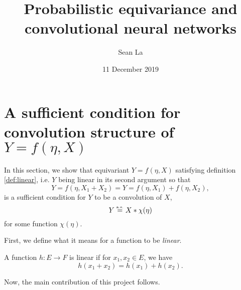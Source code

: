 \documentclass[10pt]{article}
\title{Probabilistic equivariance and convolutional neural networks} %
\author{Sean La} %
\date{11 December 2019} %
\begin{document}
\maketitle



\section{A sufficient condition for convolution structure of $Y = f(\eta,X)$}
In this section, we show that equivariant $Y = f(\eta,X)$ satisfying definition \ref{def:linear}, i.e. $Y$ being linear in its second argument so that
$$
	Y = f(\eta, X_1 + X_2) = Y = f(\eta,X_1) + f(\eta,X_2),
$$
is a sufficient condition for $Y$ to be a convolution of $X$,
$$
	Y \stackrel{\text{\rm\tiny a.s.}}{=} X * \chi(\eta)
$$
for some function $\chi(\eta)$.

First, we define what it means for a function to be \textit{linear}.
\begin{definition} \label{def:linear}
	A function $h: E \to F$ is linear if for $x_1, x_2 \in E$, we have
	$$
		h(x_1 + x_2) = h(x_1) + h(x_2).
	$$ 
\end{definition}

\noindent

Now, the main contribution of this project follows.
\end{document}
